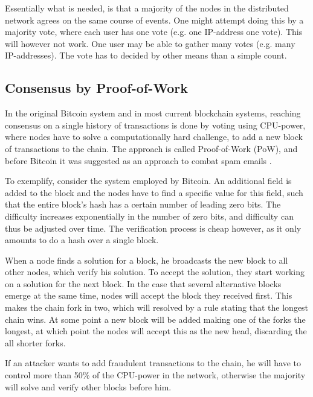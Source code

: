 \documentclass[oneside,a4paper,10pts,article]{memoir}
\begin{document}
Essentially what is needed, is that a majority of the nodes in the
distributed network agrees on the same course of events. One might
attempt doing this by a majority vote, where each user has one vote
(e.g. one IP-address one vote). This will however not work. One user
may be able to gather many votes (e.g. many IP-addresses). The vote
has to decided by other means than a simple count.

\subsection{Consensus by Proof-of-Work}
In the original Bitcoin system and in most current blockchain systems,
reaching consensus on a single history of transactions is done by
voting using CPU-power, where nodes have to solve a computationally
hard challenge, to add a new block of transactions to the chain. The
approach is called Proof-of-Work (PoW), and before Bitcoin it was suggested
as an approach to combat spam emails \cite{dwork1992pricing}.

To exemplify, consider the system employed by Bitcoin. An additional
field is added to the block and the nodes have to find a specific
value for this field, such that the entire block's hash has a certain
number of leading zero bits. The difficulty increases exponentially in
the number of zero bits, and difficulty can thus be adjusted over
time. The verification process is cheap however, as it only amounts to
do a hash over a single block.

When a node finds a solution for a block, he broadcasts the new block
to all other nodes, which verify his solution. To accept the solution,
they start working on a solution for the next block. In the case that
several alternative blocks emerge at the same time, nodes will accept
the block they received first. This makes the chain fork in two, which
will resolved by a rule stating that the longest chain wins. At some
point a new block will be added making one of the forks the longest,
at which point the nodes will accept this as the new head, discarding
the all shorter forks.

If an attacker wants to add fraudulent transactions to the chain, he
will have to control more than 50\% of the CPU-power in the network,
otherwise the majority will solve and verify other blocks before him.
\end{document}
